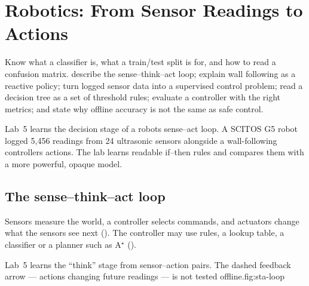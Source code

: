 \chapter{Robotics: From Sensor Readings to Actions}
\label{ch:robotics}

\chapterguide%
  {Know what a classifier is, what a train/test split is for, and how to read a confusion matrix.}
  {describe the sense--think--act loop; explain wall following as a reactive policy; turn logged sensor data into a supervised control problem; read a decision tree as a set of threshold rules; evaluate a controller with the right metrics; and state why offline accuracy is not the same as safe control.}

Lab~5 learns the decision stage of a robot\textquotesingle s sense--act loop. A SCITOS G5 robot logged 5,456 readings from 24 ultrasonic sensors alongside a wall-following controller\textquotesingle s actions. The lab learns readable if--then rules and compares them with a more powerful, opaque model.

\section{The sense--think--act loop}

Sensors measure the world, a controller selects commands, and actuators change what the sensors see next (). The controller may use rules, a lookup table, a classifier or a planner such as A$^\star$ ().

\begin{utpfig}{Lab~5 learns the ``think'' stage from sensor--action pairs. The dashed feedback arrow --- actions changing future readings --- is not tested offline.}{fig:sta-loop}
\end{utpfig}

